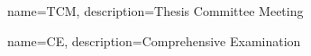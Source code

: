 {
    name=TCM,
    description={Thesis Committee Meeting}
}

{
    name=CE,
    description={Comprehensive Examination}
}
